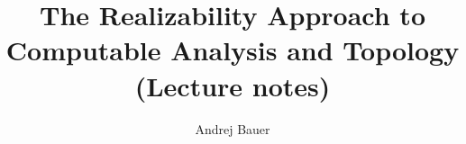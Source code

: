 \documentclass[11pt,a4paper,twoside]{book}
\newcommand{\clearemptydoublepage}{\newpage{\pagestyle{empty}\cleardoublepage}}
\begin{document}
\title{
  The Realizability Approach to\\
  Computable Analysis and Topology\\
  (Lecture notes)
}

\author{Andrej Bauer}

\maketitle


\clearemptydoublepage

{
\renewcommand{\markboth}[2]{}
\tableofcontents
}







\clearemptydoublepage



{
\renewcommand{\markboth}[2]{}

}
\end{document}
